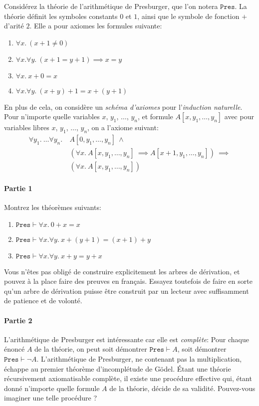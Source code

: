 \documentclass[12pt,french,a4paper]{article}
\begin{document}
\begin{question}
Considérez la théorie de l'arithmétique de Presburger, que l'on notera $\texttt{Pres}$.
La théorie définit les symboles constants $0$ et $1$, ainsi que le symbole de fonction $+$ d'arité $2$.
Elle a pour axiomes les formules suivante:
\begin{enumerate}
\item $\forall x.\ (x + 1 \neq 0)$
\item $\forall x. \forall y.\ (x + 1 = y + 1) \implies x = y$
\item $\forall x.\ x + 0 = x$
\item $\forall x. \forall y.\ (x + y) + 1 = x + (y + 1)$
\end{enumerate}
En plus de cela, on considère un \textit{schéma d'axiomes} pour l'\textit{induction naturelle}.
Pour n'importe quelle variables $x$, $y_1$, $\dots$, $y_n$, et formule $A[x, y_1, \dots, y_n]$ avec pour variables libres $x$, $y_1$, $\dots$, $y_n$, on a l'axiome suivant:
\begin{align*}
\forall y_1.\ \dots \forall y_n.\ &A[0, y_1, \dots, y_n]\ \wedge\\
&(\forall x.\ A[x, y_1, \dots, y_n]\ \implies A[x + 1, y_1, \dots, y_n])\ \implies\\
&(\forall x.\ A[x, y_1, \dots, y_n])
\end{align*}

\paragraph{Partie 1}

Montrez les théorèmes suivants:
\begin{enumerate}
\item $\texttt{Pres} \vdash \forall x.\ 0 + x = x$
\item $\texttt{Pres} \vdash \forall x. \forall y.\ x + (y + 1) = (x + 1) + y$
\item $\texttt{Pres} \vdash \forall x. \forall y.\ x + y = y + x$
\end{enumerate}
Vous n'êtes pas obligé de construire explicitement les arbres de dérivation, et pouvez à la place faire des preuves en français.
Essayez toutefois de faire en sorte qu'un arbre de dérivation puisse être construit par un lecteur avec suffisamment de patience et de volonté.

\paragraph{Partie 2}

L'arithmétique de Presburger est intéressante car elle est \textit{complète}: Pour chaque énoncé $A$ de la théorie, on peut soit démontrer $\texttt{Pres} \vdash A$, soit démontrer $\texttt{Pres} \vdash \neg A$.
L'arithmétique de Presburger, ne contenant pas la multiplication, échappe au premier théorème d'incomplétude de Gödel.
Étant une théorie récursivement axiomatisable complète, il existe une procédure effective qui, étant donné n'importe quelle formule $A$ de la théorie, décide de sa validité. Pouvez-vous imaginer une telle procédure ?
\end{question}
\end{document}
